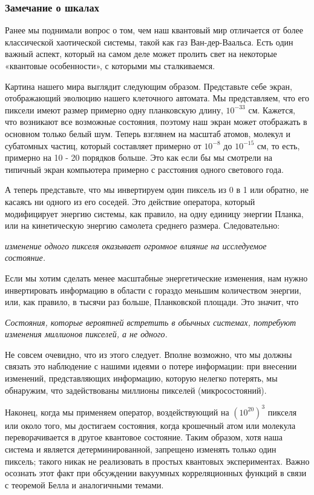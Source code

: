 \documentclass[main.tex]{subfiles}
\begin{document}
\subsubsection{Замечание о шкалах }\label{ch5.7.6}

Ранее мы поднимали вопрос о том, чем наш квантовый мир отличается от более классической хаотической системы, такой как газ Ван-дер-Ваальса. Есть один важный аспект, который на самом деле может пролить свет на некоторые «квантовые особенности», с которыми мы сталкиваемся.

Картина нашего мира выглядит следующим образом. Представьте себе экран, отображающий эволюцию нашего клеточного автомата. Мы представляем, что его пиксели имеют размер примерно одну планковскую длину, $10^{-33}$ см. Кажется, что возникают все возможные состояния, поэтому наш экран может отображать в основном только белый шум. Теперь взглянем на масштаб атомов, молекул и субатомных частиц, который составляет примерно от $10^{-8}$ до $10^{-15}$ см, то есть, примерно на 10 - 20 порядков больше. Это как если бы мы смотрели на типичный экран компьютера примерно с расстояния одного светового года.

А теперь представьте, что мы инвертируем один пиксель из 0 в 1 или обратно, не касаясь ни одного из его соседей. Это действие оператора, который модифицирует энергию системы, как правило, на одну единицу энергии Планка, или на кинетическую энергию самолета среднего размера. Следовательно:

\textit{изменение одного пикселя оказывает огромное влияние на исследуемое состояние.}

Если мы хотим сделать менее масштабные энергетические изменения, нам нужно инвертировать информацию в области с гораздо меньшим количеством энергии, или, как правило, в тысячи раз больше, Планковской площади. Это значит, что

\textit{Состояния, которые вероятней встретить в обычных системах, потребуют изменения миллионов пикселей, а не одного.}

Не совсем очевидно, что из этого следует. Вполне возможно, что мы должны связать это наблюдение с нашими идеями о потере информации: при внесении изменений, представляющих информацию, которую нелегко потерять, мы обнаружим, что задействованы миллионы пикселей (микросостояний).

Наконец, когда мы применяем оператор, воздействующий на $(10^{20})^3$ пикселя или около того, мы достигаем состояния, когда крошечный атом или молекула переворачивается в другое квантовое состояние. Таким образом, хотя наша система и является детерминированной, запрещено изменять только один пиксель; такого никак не реализовать в простых квантовых экспериментах. Важно осознать этот факт при обсуждении вакуумных корреляционных функций в связи с теоремой Белла и аналогичными темами.
\end{document}
